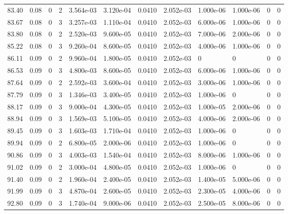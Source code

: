 \documentclass[preview]{standalone}
\begin{document}
{{{{{\begin{tabular}{L{1.2cm}C{1.2cm} C{0.3cm}C{0.5cm} C{1.4cm}C{1.4cm} C{1.4cm}C{1.4cm} C{1.6cm}C{1.6cm} C{1.6cm}C{1.6cm}}
  83.40  &  0.08  & 0     &  2 &  3.564e-03  & 3.120e-04  &  0.0410&   2.052e-03& 1.000e-06 & 1.000e-06   &  0 & 0  \\ 
  83.67  &  0.08  & 0     &  3 &  3.257e-03  & 1.110e-04  &  0.0410&   2.052e-03& 6.000e-06 & 1.000e-06   &  0 & 0  \\ 
  83.80  &  0.08  & 0     &  2 &  2.520e-03  & 9.600e-05  &  0.0410&   2.052e-03& 7.000e-06 & 2.000e-06   &  0 & 0  \\ 
  85.22  &  0.08  & 0     &  3 &  9.260e-04  & 8.600e-05  &  0.0410&   2.052e-03& 4.000e-06 & 1.000e-06   &  0 & 0  \\ 
  86.11  &  0.09  & 0     &  2 &  9.960e-04  & 1.800e-05  &  0.0410&   2.052e-03& 0 & 0   &  0 & 0  \\ 
  86.53  &  0.09  & 0     &  3 &  4.800e-03  & 8.600e-05  &  0.0410&   2.052e-03& 6.000e-06 & 1.000e-06   &  0 & 0  \\ 
  87.64  &  0.09  & 0     &  2 &  2.592e-03  & 3.600e-04  &  0.0410&   2.052e-03& 3.000e-06 & 1.000e-06   &  0 & 0  \\ 
  87.79  &  0.09  & 0     &  3 &  1.346e-03  & 3.400e-05  &  0.0410&   2.052e-03& 1.000e-06 & 0   &  0 & 0  \\ 
  88.17  &  0.09  & 0     &  3 &  9.000e-04  & 4.300e-05  &  0.0410&   2.052e-03& 1.000e-05 & 2.000e-06   &  0 & 0  \\ 
  88.94  &  0.09  & 0     &  3 &  1.569e-03  & 5.100e-05  &  0.0410&   2.052e-03& 4.000e-06 & 2.000e-06   &  0 & 0  \\ 
  89.45  &  0.09  & 0     &  3 &  1.603e-03  & 1.710e-04  &  0.0410&   2.052e-03& 1.000e-06 & 0   &  0 & 0  \\ 
  89.94  &  0.09  & 0     &  2 &  6.800e-05  & 2.000e-06  &  0.0410&   2.052e-03& 1.000e-06 & 0   &  0 & 0  \\ 
  90.86  &  0.09  & 0     &  3 &  4.003e-03  & 1.540e-04  &  0.0410&   2.052e-03& 8.000e-06 & 1.000e-06   &  0 & 0  \\ 
  91.02  &  0.09  & 0     &  2 &  3.000e-04  & 4.800e-05  &  0.0410&   2.052e-03& 1.000e-06 & 0   &  0 & 0  \\ 
  91.40  &  0.09  & 0     &  2 &  1.960e-04  & 2.400e-05  &  0.0410&   2.052e-03& 1.400e-05 & 5.000e-06   &  0 & 0  \\ 
  91.99  &  0.09  & 0     &  3 &  4.870e-04  & 2.600e-05  &  0.0410&   2.052e-03& 2.300e-05 & 4.000e-06   &  0 & 0  \\ 
  92.80  &  0.09  & 0     &  3 &  1.740e-04  & 9.000e-06  &  0.0410&   2.052e-03& 2.500e-05 & 8.000e-06   &  0 & 0  \\ 

\end{tabular}}}}}}
\end{document}
